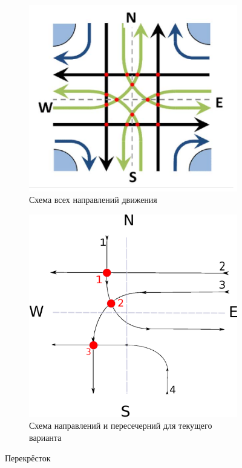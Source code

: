 \documentclass[12pt]{article}
\begin{document}
\begin{figure}[h!]
    \begin{subfigure}[b]{.49\linewidth}
    \includegraphics[width=\linewidth]{crossroad.png}
    \caption{Схема всех направлений движения}
    \end{subfigure}
    \begin{subfigure}[b]{.45\linewidth}
    \includegraphics[width=\linewidth]{scheme.eps}
    \caption{Схема направлений и пересечерний для текущего варианта}
    \end{subfigure}
    \caption{Перекрёсток}
    \label{fig:1}
\end{figure}
\end{document}
